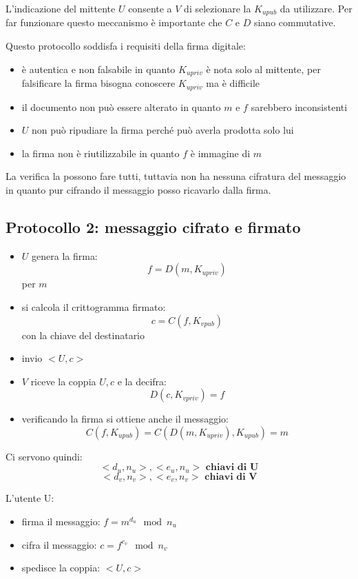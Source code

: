 L'indicazione del mittente $U$ consente a $V$ di selezionare la $K_{upub}$ da utilizzare.
Per far funzionare questo meccanismo è importante che $C$ e $D$ siano commutative.

Questo protocollo soddisfa i requisiti della firma digitale:
\begin{itemize}
    \item è autentica e non falsabile in quanto $K_{upriv}$  è nota solo al mittente, per falsificare la firma bisogna conoscere $K_{upriv}$ ma è difficile
    \item il documento non può essere alterato in quanto $m$ e $f$ sarebbero inconsistenti
    \item $U$ non può ripudiare la firma perché può averla prodotta solo lui
    \item la firma non è riutilizzabile in quanto $f$ è immagine di $m$
\end{itemize}

La verifica la possono fare tutti, tuttavia non ha nessuna cifratura del messaggio in quanto pur cifrando il messaggio posso ricavarlo dalla firma.

\subsection{Protocollo 2: messaggio cifrato e firmato}
\begin{itemize}
    \item $U$ genera la firma:
    $$ f = D(m, K_{upriv}) $$
    per $m$
    \item si calcola il crittogramma firmato:
    $$ c = C(f, K_{vpub}) $$
    con la chiave del destinatario
    \item invio $<U, c>$
    \item $V$ riceve la coppia $U, c$ e la decifra:
    $$ D(c, K_{vpriv}) = f $$
    \item verificando la firma si ottiene anche il messaggio:
    $$ C(f, K_{upub}) = C(D(m, K_{upriv}), K_{upub}) = m $$
\end{itemize}

Ci servono quindi:
$$ <d_u, n_u>, <e_u, n_u> \textbf{ chiavi di U} $$
$$ <d_v, n_v>, <e_v, n_v> \textbf{ chiavi di V} $$

L'utente U:
\begin{itemize}
    \item firma il messaggio: $f = m^{d_u} \mod n_u$
    \item cifra il messaggio: $c = f^{e_v} \mod n_v$
    \item spedisce la coppia: $<U, c>$
\end{itemize}

